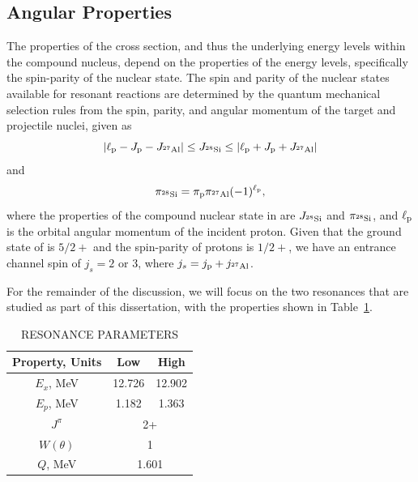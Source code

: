 \subsection{Angular Properties}

The properties of the cross section, and thus the underlying energy
levels within the compound nucleus, depend on the properties of the
energy levels, specifically the spin-parity of the nuclear state. The
spin and parity of the nuclear states available for resonant reactions
are determined by the quantum mechanical selection rules from the spin,
parity, and angular momentum of the target and projectile nuclei, given
as
\[
    \left|\ell_{\rm{p}} - J_{\rm{p}} - J_{{}^{27}\textrm{Al}}\right|
    \leq J_{{}^{28}\textrm{Si}} \leq
    \left|\ell_{\rm{p}} + J_{\rm{p}} + J_{{}^{27}\textrm{Al}}\right|
\]
and
\[
    \pi_{{}^{28}\textrm{Si}} = \pi_{\rm{p}}\pi_{{}^{27}\textrm{Al}}(-1)^{\ell_{\rm{p}}},
\]
where the properties of the compound nuclear state in  are
$J_{{}^{28}\textrm{Si}}$ and $\pi_{{}^{28}\textrm{Si}}$, and $\ell_{\rm{p}}$ is
the orbital angular momentum of the incident proton. Given that the
ground state of  is $5/2+$ and the spin-parity of protons is
$1/2+$, we have an entrance channel spin of $j_s = 2$ or 3, where
$j_s = j_{\rm{p}} + j_{{}^{27}\textrm{Al}}$.

For the remainder of the discussion, we will focus on the two resonances
that are studied as part of this dissertation, with the properties shown
in Table~\ref{tab:resonance-properties}.

\begin{table}
    \begin{center}
        \caption{RESONANCE PARAMETERS}
        \label{tab:resonance-properties}
        \begin{tabular}{ccc}
            \toprule
            \midrule
                \textbf{Property, Units} & \textbf{Low} & \textbf{High} \\
            \midrule
                $E_{x}$, MeV \cite{NNDC}        & 12.726 & 12.902 \\
                $E_{p}$, MeV                & 1.182 & 1.363 \\
                $J^{\pi}$ \cite{Nelson1984}      & \multicolumn{2}{c}{2+} \\
                $W\left(\theta\right)$ \cite{Andersen1961} & \multicolumn{2}{c}{1} \\
                $Q$, MeV                        & \multicolumn{2}{c}{1.601} \\
            \bottomrule
        \end{tabular}
    \end{center}
\end{table}

